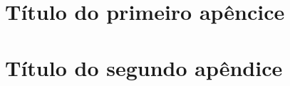 
\begin{apendicesenv}

\partapendices

\chapter{Título do primeiro apêncice}

\lipsum[50] %

\chapter{Título do segundo apêndice}
\lipsum[51-53] %

\end{apendicesenv}
